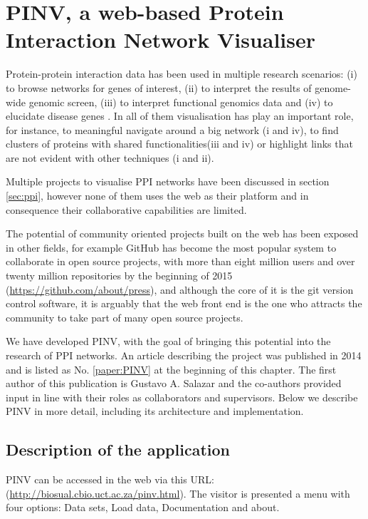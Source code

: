 \newpage





\section{PINV, a web-based Protein Interaction Network Visualiser }  \label{section:pinv}
Protein-protein interaction data has been used in multiple research scenarios: (i) to browse networks for genes of interest, (ii) to interpret the results of genome-wide genomic screen, (iii) to interpret functional genomics data and (iv) to elucidate disease genes \cite{FRA2013}. In all of them visualisation has play an important role, for instance,  to meaningful navigate around a big network (i and iv), to find clusters of proteins with shared functionalities(iii and iv)  or highlight links that are not evident with other techniques (i and ii).

Multiple projects to visualise PPI networks have been discussed in section \ref{sec:ppi}, however none of them uses the web as their platform and in consequence their collaborative capabilities are limited. 

The potential of community oriented projects built on the web has been exposed in other fields, for example GitHub has become the most popular system to collaborate in open source projects, with more than eight million users and over twenty million repositories by the beginning of 2015 (\url{https://github.com/about/press}), and although the core of it is the git version control software, it is arguably that the web front end is the one who attracts the community to take part of many open source projects.

We have developed PINV, with the goal of bringing this potential into the research of PPI networks. An article describing the project was published in 2014 and is listed as No. \ref{paper:PINV} at the beginning of this chapter. The first author of this publication is Gustavo A. Salazar and the co-authors provided input in line with their roles as collaborators and supervisors. Below we describe PINV in more detail, including its architecture and implementation.

\subsection{Description of the application} \label{section:pinv_gui}

PINV can be accessed in the web via this URL: (\url{http://biosual.cbio.uct.ac.za/pinv.html}). The visitor is presented a menu with four options: Data sets, Load data, Documentation and about. 

